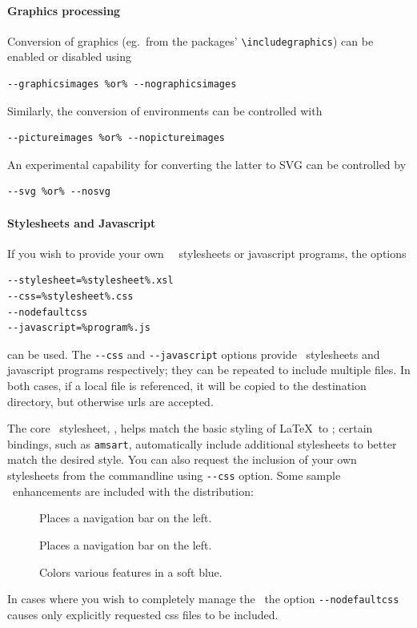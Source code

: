 \documentclass{book}
\newcommand{\shellcode}{\lstinline[style=shell]}
\begin{document}
\paragraph[Graphics]{Graphics processing}
Conversion of graphics (eg.~from the  packages' 
\verb|\includegraphics|) can be enabled or disabled
using
\begin{lstlisting}[style=shell]
--graphicsimages %or% --nographicsimages
\end{lstlisting}
Similarly, the conversion of  environments can be controlled with
\begin{lstlisting}[style=shell]
--pictureimages %or% --nopictureimages
\end{lstlisting}
An experimental capability for converting the latter to \textsc{SVG} can be
controlled by
\begin{lstlisting}[style=shell]
--svg %or% --nosvg
\end{lstlisting}

\paragraph{Stylesheets and Javascript}
If you wish to provide your own \XSLT\,
\CSS\ stylesheets or javascript programs, the options 
\begin{lstlisting}[style=shell]
--stylesheet=%stylesheet%.xsl
--css=%stylesheet%.css
--nodefaultcss
--javascript=%program%.js
\end{lstlisting}
can be used.  The \shellcode{--css} and  \shellcode{--javascript} options provide \CSS\ stylesheets
and javascript programs respectively; they can be repeated to include multiple files.
In both cases, if a local file is referenced, it will be copied to the
destination directory, but otherwise urls are accepted.

The core \CSS\ stylesheet, , helps match the basic
styling of \LaTeX\ to \HTML; certain bindings, such as \texttt{amsart},
automatically include additional stylesheets to better match the desired style.
You can also request the inclusion of your own stylesheets from the commandline using
\shellcode{--css} option.  Some sample \CSS\ enhancements are included with the distribution:
\begin{description}
\item[] Places a navigation bar on the left.
\item[] Places a navigation bar on the left.
\item[] Colors various features in a soft blue.
\end{description}
In cases where you wish to completely manage the \CSS\,
the option \shellcode{--nodefaultcss} causes only explicitly requested css files to be included.
\end{document}
